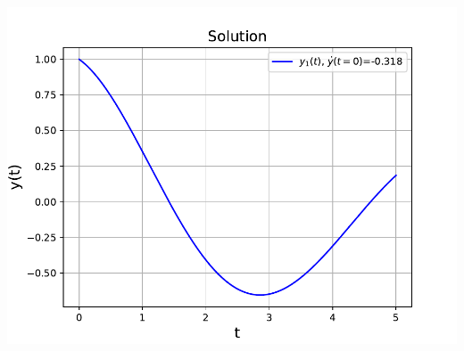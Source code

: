\documentclass[10pt,a4paper]{article}
\begin{document}
\begin{center}
\includegraphics[scale=0.8]{img/sol_bvp.pdf}
\end{center}
\end{document}

